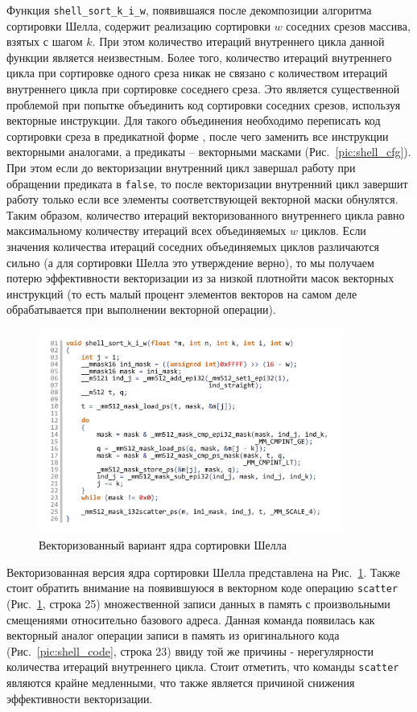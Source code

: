\documentclass[utf8]{psta}
\begin{document}
Функция \texttt{shell\_sort\_k\_i\_w}, появившаяся после декомпозиции алгоритма сортировки Шелла, содержит реализацию сортировки $w$ соседних срезов массива, взятых с шагом $k$. 
При этом количество итераций внутреннего цикла данной функции является неизвестным. 
Более того, количество итераций внутреннего цикла при сортировке одного среза никак не связано с количеством итераций внутреннего цикла при сортировке соседнего среза. 
Это является существенной проблемой при попытке объединить код сортировки соседних срезов, используя векторные инструкции. 
Для такого объединения необходимо переписать код сортировки среза в предикатной форме \cite{Volkonskyi}, после чего заменить все инструкции векторными аналогами, а предикаты -- векторными масками (Рис.~\ref{pic:shell_cfg}). 
При этом если до векторизации внутренний цикл завершал работу при обращении предиката в \texttt{false}, то после векторизации внутренний цикл завершит работу только если все элементы соответствующей векторной маски обнулятся. 
Таким образом, количество итераций векторизованного внутреннего цикла равно максимальному количеству итераций всех объединяемых $w$ циклов. 
Если значения количества итераций соседних объединяемых циклов различаются сильно (а для сортировки Шелла это утверждение верно), то мы получаем потерю эффективности векторизации из за низкой плотнойти масок векторных инструкций (то есть малый процент элементов векторов на самом деле обрабатывается при выполнении векторной операции).

\begin{figure}
\includegraphics[width=10cm]{pics/pic_shell_code_vect}
\caption{Векторизованный вариант ядра сортировки Шелла}
\label{pic:shell_code_vect}
\end{figure}

Векторизованная версия ядра сортировки Шелла представлена на Рис.~\ref{pic:shell_code_vect}. 
Также стоит обратить внимание на появившуюся в векторном коде операцию \texttt{scatter} (Рис.~\ref{pic:shell_code_vect}, строка 25) множественной записи данных в память с произвольными смещениями относительно базового адреса. 
Данная команда появилась как векторный аналог операции записи в память из оригинального кода (Рис.~\ref{pic:shell_code}, строка 23) ввиду той же причины - нерегулярности количества итераций внутреннего цикла. 
Стоит отметить, что команды \texttt{scatter} являются крайне медленными, что также является причиной снижения эффективности векторизации.
\end{document}
